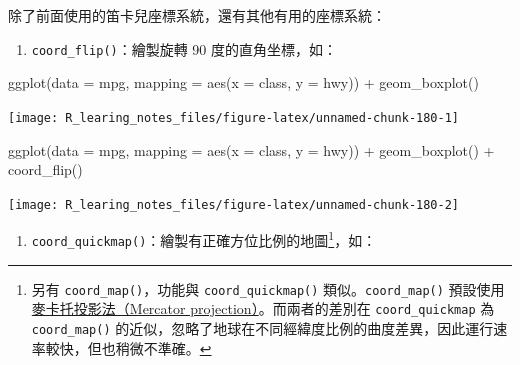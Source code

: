 \documentclass[
]{book}
\newenvironment{Shaded}{\begin{snugshade}}{\end{snugshade}}
\newcommand{\AttributeTok}[1]{\textcolor[rgb]{0.77,0.63,0.00}{#1}}
\newcommand{\FunctionTok}[1]{\textcolor[rgb]{0.00,0.00,0.00}{#1}}
\newcommand{\NormalTok}[1]{#1}
\newcommand{\SpecialCharTok}[1]{\textcolor[rgb]{0.00,0.00,0.00}{#1}}
\providecommand{\tightlist}{%
  \setlength{\itemsep}{0pt}\setlength{\parskip}{0pt}}
\let\oldfootnote\footnote
\renewcommand\footnote[1]{\oldfootnote{%
\renewcommand\baselinestretch{1.1}%
\large\footnotesize\ignorespaces#1}}
\theoremstyle{definition}
\theoremstyle{remark}
\begin{document}
除了前面使用的笛卡兒座標系統，還有其他有用的座標系統：

\begin{enumerate}
\def\labelenumi{\arabic{enumi}.}
\tightlist
\item
  \texttt{coord\_flip()}：繪製旋轉 90 度的直角坐標，如：
\end{enumerate}

\begin{Shaded}
\begin{Highlighting}[]
\FunctionTok{ggplot}\NormalTok{(}\AttributeTok{data =}\NormalTok{ mpg, }\AttributeTok{mapping =} \FunctionTok{aes}\NormalTok{(}\AttributeTok{x =}\NormalTok{ class, }\AttributeTok{y =}\NormalTok{ hwy)) }\SpecialCharTok{+} \FunctionTok{geom\_boxplot}\NormalTok{()}
\end{Highlighting}
\end{Shaded}

\begin{center}\texttt{[image: R\_learing\_notes\_files/figure-latex/unnamed-chunk-180-1]} \end{center}

\begin{Shaded}
\begin{Highlighting}[]
\FunctionTok{ggplot}\NormalTok{(}\AttributeTok{data =}\NormalTok{ mpg, }\AttributeTok{mapping =} \FunctionTok{aes}\NormalTok{(}\AttributeTok{x =}\NormalTok{ class, }\AttributeTok{y =}\NormalTok{ hwy)) }\SpecialCharTok{+} \FunctionTok{geom\_boxplot}\NormalTok{() }\SpecialCharTok{+} \FunctionTok{coord\_flip}\NormalTok{()}
\end{Highlighting}
\end{Shaded}

\begin{center}\texttt{[image: R\_learing\_notes\_files/figure-latex/unnamed-chunk-180-2]} \end{center}

\begin{enumerate}
\def\labelenumi{\arabic{enumi}.}
\setcounter{enumi}{1}
\tightlist
\item
  \texttt{coord\_quickmap()}：繪製有正確方位比例的地圖\footnote{另有 \texttt{coord\_map()}，功能與 \texttt{coord\_quickmap()} 類似。\texttt{coord\_map()} 預設使用\href{https://zh.wikipedia.org/wiki/\%E9\%BA\%A5\%E5\%8D\%A1\%E6\%89\%98\%E6\%8A\%95\%E5\%BD\%B1\%E6\%B3\%95}{麥卡托投影法（Mercator projection）}。而兩者的差別在 \texttt{coord\_quickmap} 為 \texttt{coord\_map()} 的近似，忽略了地球在不同經緯度比例的曲度差異，因此運行速率較快，但也稍微不準確。}，如：
\end{enumerate}
\end{document}
